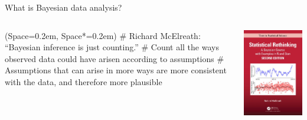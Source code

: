 \documentclass[12pt, aspectratio=149]{beamer}
\newcommand{\listSpace}{0.2em}
\theoremstyle{plain}
\begin{document}
\begin{frame}[fragile]{What is Bayesian data analysis?}
	\begin{columns}
		\begin{column}{0.7\linewidth}
			\begin{easylist}
					\ListProperties(Space=\listSpace, Space*=\listSpace)
					# Richard McElreath: ``Bayesian inference is just counting.''  
					# Count all the ways observed data could have arisen according to assumptions
					# Assumptions that can arise in more ways are more consistent with the data, and therefore more plausible
			\end{easylist}
		\end{column}
	\begin{column}{0.3\textwidth}
		\includegraphics[height=0.7\textheight]{figs/rethinking3.jpg}
	\end{column}
	\end{columns}
\end{frame}
\end{document}
